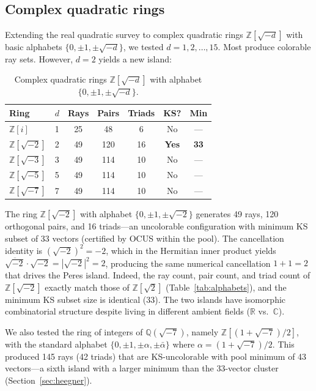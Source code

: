 \documentclass[12pt,a4paper]{article}
\newcommand{\R}{\mathbb{R}}
\newcommand{\C}{\mathbb{C}}
\newcommand{\Z}{\mathbb{Z}}
\newcommand{\Q}{\mathbb{Q}}
\begin{document}
\subsection{Complex quadratic rings}\label{sec:complex-quadratic}

Extending the real quadratic survey to complex quadratic rings $\Z[\sqrt{-d}]$ with basic alphabets $\{0, \pm 1, \pm\sqrt{-d}\}$, we tested $d = 1, 2, \ldots, 15$. Most produce colorable ray sets. However, $d = 2$ yields a new island:

\begin{table}[ht]
\centering
\caption{Complex quadratic rings $\Z[\sqrt{-d}]$ with alphabet $\{0, \pm 1, \pm\sqrt{-d}\}$.}
\label{tab:complex-quadratic}
\begin{tabular}{lcccccc}
\toprule
Ring & $d$ & Rays & Pairs & Triads & KS? & Min \\
\midrule
$\Z[i]$ & 1 & 25 & 48 & 6 & No & --- \\
$\Z[\sqrt{-2}]$ & 2 & 49 & 120 & 16 & \textbf{Yes} & \textbf{33} \\
$\Z[\sqrt{-3}]$ & 3 & 49 & 114 & 10 & No & --- \\
$\Z[\sqrt{-5}]$ & 5 & 49 & 114 & 10 & No & --- \\
$\Z[\sqrt{-7}]$ & 7 & 49 & 114 & 10 & No & --- \\
\bottomrule
\end{tabular}
\end{table}

The ring $\Z[\sqrt{-2}]$ with alphabet $\{0, \pm 1, \pm\sqrt{-2}\}$ generates 49 rays, 120 orthogonal pairs, and 16 triads---an uncolorable configuration with minimum KS subset of 33 vectors (certified by OCUS within the pool). The cancellation identity is $(\sqrt{-2})^2 = -2$, which in the Hermitian inner product yields $\overline{\sqrt{-2}} \cdot \sqrt{-2} = |\sqrt{-2}|^2 = 2$, producing the same numerical cancellation $1 + 1 = 2$ that drives the Peres island. Indeed, the ray count, pair count, and triad count of $\Z[\sqrt{-2}]$ exactly match those of $\Z[\sqrt{2}]$ (Table~\ref{tab:alphabets}), and the minimum KS subset size is identical (33). The two islands have isomorphic combinatorial structure despite living in different ambient fields ($\R$ vs.\ $\C$).

We also tested the ring of integers of $\Q(\sqrt{-7})$, namely $\Z[(1+\sqrt{-7})/2]$, with the standard alphabet $\{0, \pm 1, \pm\alpha, \pm\bar\alpha\}$ where $\alpha = (1+\sqrt{-7})/2$.  This produced 145 rays (42 triads) that are KS-uncolorable with pool minimum of 43 vectors---a sixth island with a larger minimum than the 33-vector cluster (Section~\ref{sec:heegner}).
\end{document}
